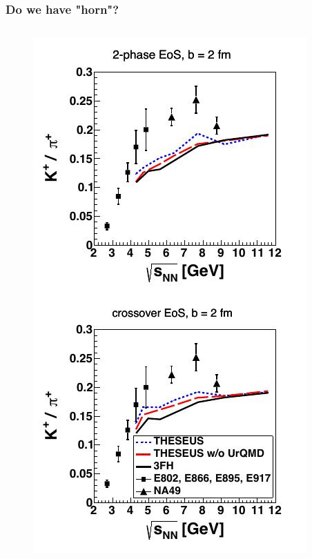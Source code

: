 \documentclass[dvipsnames] {beamer}
\begin{document}
\begin{frame}
  \frametitle{\bf \centering Do we have "horn"?}
  \begin{columns}[c]
   \begin{block}{}
     \begin{figure}[H]
       \includegraphics[width=1.\textwidth]{hornPlot.jpg}
     \end{figure}

\end{block}
\end{columns}
\end{frame}
\end{document}
